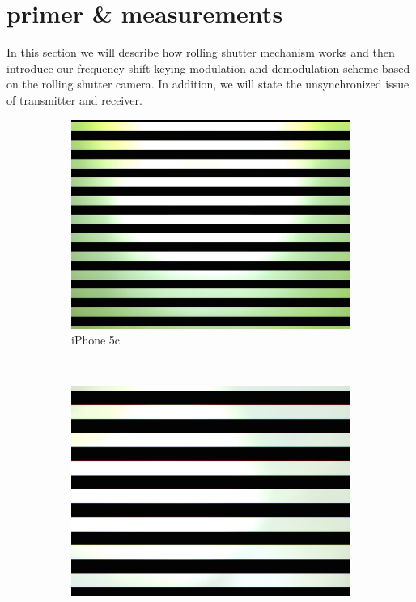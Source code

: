 \section {primer \& measurements}

In this section we will describe how rolling shutter mechanism works and then introduce our frequency-shift keying modulation and demodulation scheme based on the rolling shutter camera. In addition, we will state the unsynchronized issue of transmitter and receiver. 









\begin{figure}[!t]
\centering
  \begin{subfigure}[h]{0.12\textwidth}
  \includegraphics[width=\textwidth]{pic/5c.JPG}
  \caption{iPhone 5c}
  \end{subfigure}
  ~ 
  \begin{subfigure}[h]{0.12\textwidth}
  \includegraphics[width=\textwidth]{pic/5s.JPG}

\end{subfigure}
\end{figure}
